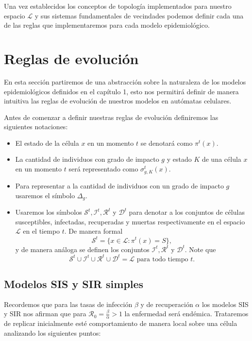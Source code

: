 Una vez establecidos los conceptos de topología implementados para nuestro espacio $\mathcal{L}$ y sus sistemas fundamentales de vecindades podemos definir cada una de las reglas que implementaremos para cada modelo epidemiológico.

\section{Reglas de evolución}

En esta sección partiremos de una abstracción sobre la naturaleza de los modelos epidemiológicos definidos en el capítulo 1, esto nos permitirá definir de manera intuitiva las reglas de evolución de nuestros modelos en autómatas celulares.

Antes de comenzar a definir nuestras reglas de evolución definiremos las siguientes notaciones:
\begin{itemize}
    \item El estado de la célula $x$ en un momento $t$ se denotará como $\pi^t(x)$.
    \item La cantidad de individuos con grado de impacto $g$ y estado $K$ de una célula $x$ en un momento $t$ será representado como $\sigma_{g,K}^t(x)$.
    \item Para representar a la cantidad de individuos con un grado de impacto $g$ usaremos el símbolo $\Delta_g$. 
    \item Usaremos los símbolos $\mathcal{S}^t,\mathcal{I}^t,\mathcal{R}^t$ y $\mathcal{D}^t$ para denotar a los conjuntos de células susceptibles, infectadas, recuperadas y muertas respectivamente en el espacio $\mathcal{L}$ en el tiempo $t$. De manera formal
    $$\mathcal{S}^t=\{x\in\mathcal{L}:\pi^t(x)=S\},$$
    y de manera análoga se definen los conjuntos $\mathcal{I}^t,\mathcal{R}^t$ y $\mathcal{D}^t$. Note que $$\mathcal{S}^t\cup\mathcal{I}^t\cup\mathcal{R}^t\cup\mathcal{D}^t=\mathcal{L}\text{ para todo tiempo }t.$$
\end{itemize}

\subsection{Modelos SIS y SIR simples}

Recordemos que para las tasas de infección $\beta$ y de recuperación $\alpha$ los modelos SIS y SIR nos afirman que para $\mathcal{R}_0=\frac{\beta}{\alpha}>1$ la enfermedad será endémica. Trataremos de replicar inicialmente esté comportamiento de manera local sobre una célula analizando los siguientes puntos:

